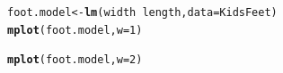 \documentclass[twoside]{book}\usepackage[]{graphicx}\usepackage[]{xcolor}
\makeatletter
\newcommand{\hlnum}[1]{\textcolor[rgb]{0.686,0.059,0.569}{#1}}%
\newcommand{\hlopt}[1]{\textcolor[rgb]{0,0,0}{#1}}%
\newcommand{\hlstd}[1]{\textcolor[rgb]{0.345,0.345,0.345}{#1}}%
\newcommand{\hlkwb}[1]{\textcolor[rgb]{0.69,0.353,0.396}{#1}}%
\newcommand{\hlkwc}[1]{\textcolor[rgb]{0.333,0.667,0.333}{#1}}%
\newcommand{\hlkwd}[1]{\textcolor[rgb]{0.737,0.353,0.396}{\textbf{#1}}}%
\newenvironment{kframe}{%
 \def\at@end@of@kframe{}%
 \ifinner\ifhmode%
  \def\at@end@of@kframe{\end{minipage}}%
  \begin{minipage}{\columnwidth}%
 \fi\fi%
 \def\FrameCommand##1{\hskip\@totalleftmargin \hskip-\fboxsep
 \colorbox{shadecolor}{##1}\hskip-\fboxsep
     \hskip-\linewidth \hskip-\@totalleftmargin \hskip\columnwidth}%
 \MakeFramed {\advance\hsize-\width
   \@totalleftmargin\z@ \linewidth\hsize
   \@setminipage}}%
 {\par\unskip\endMakeFramed%
 \at@end@of@kframe}
\newenvironment{knitrout}{}{} %
\makeatother
\begin{document}
\begin{solution}
\begin{knitrout}
\color{fgcolor}\begin{kframe}
\begin{alltt}
\hlstd{foot.model} \hlkwb{<-} \hlkwd{lm}\hlstd{(width} \hlopt{~} \hlstd{length,} \hlkwc{data} \hlstd{= KidsFeet)}
\hlkwd{mplot}\hlstd{(foot.model,} \hlkwc{w} \hlstd{=} \hlnum{1}\hlstd{)}
\end{alltt}


{\ttfamily\noindent\itshape{}}\begin{alltt}
\hlkwd{mplot}\hlstd{(foot.model,} \hlkwc{w} \hlstd{=} \hlnum{2}\hlstd{)}
\end{alltt}
\end{kframe}


\end{knitrout}
\end{solution}
\end{document}
